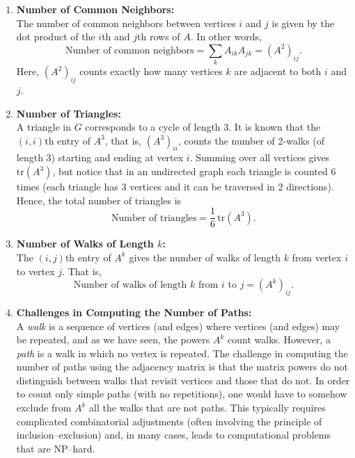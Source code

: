 \documentclass[a4paper,12pt]{article}
\begin{document}
\begin{enumerate}
    \item \textbf{Number of Common Neighbors:} \\
    The number of common neighbors between vertices \( i \) and \( j \) is given by the dot product of the \( i \)th and \( j \)th rows of \( A \). In other words,
    \[
    \text{Number of common neighbors} = \sum_{k} A_{ik} A_{jk} = (A^2)_{ij}.
    \]
    Here, \( (A^2)_{ij} \) counts exactly how many vertices \( k \) are adjacent to both \( i \) and \( j \).

    \item \textbf{Number of Triangles:} \\
    A triangle in \( G \) corresponds to a cycle of length 3. It is known that the \((i,i)\)th entry of \( A^3 \), that is, \( (A^3)_{ii} \), counts the number of 2-walks (of length 3) starting and ending at vertex \( i \). Summing over all vertices gives \( \text{tr}(A^3) \), but notice that in an undirected graph each triangle is counted 6 times (each triangle has 3 vertices and it can be traversed in 2 directions). Hence, the total number of triangles is
    \[
    \text{Number of triangles} = \frac{1}{6}\,\mathrm{tr}(A^3).
    \]

    \item \textbf{Number of Walks of Length \( k \):} \\
    The \((i,j)\)th entry of \( A^k \) gives the number of walks of length \( k \) from vertex \( i \) to vertex \( j \). That is,
    \[
    \text{Number of walks of length } k \text{ from } i \text{ to } j = (A^k)_{ij}.
    \]

    \item \textbf{Challenges in Computing the Number of Paths:} \\
    A \emph{walk} is a sequence of vertices (and edges) where vertices (and edges) may be repeated, and as we have seen, the powers \( A^k \) count walks. However, a \emph{path} is a walk in which no vertex is repeated. The challenge in computing the number of paths using the adjacency matrix is that the matrix powers do not distinguish between walks that revisit vertices and those that do not. In order to count only simple paths (with no repetitions), one would have to somehow exclude from \( A^k \) all the walks that are not paths. This typically requires complicated combinatorial adjustments (often involving the principle of inclusion–exclusion) and, in many cases, leads to computational problems that are NP–hard.


\end{enumerate}
\end{document}
